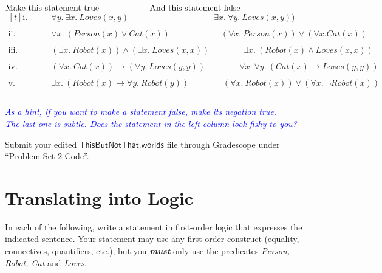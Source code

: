 \documentclass{article}
\renewcommand{\(}{\left(}
\renewcommand{\)}{\right)}
\theoremstyle{plain}
\theoremstyle{plain}
\theoremstyle{definition}
\newcommand{\annotate}[1]{\textit{\textcolor{blue}{#1}}}
\begin{document}
$    \textrm{Make this statement true} \qquad \qquad \qquad \textrm{And this statement false}\\\\$
    $\begin{aligned}[t]
    \textrm{i.} \qquad &\forall y.\ \exists x.\ Loves(x, y)
    \qquad \qquad \qquad \qquad \qquad \exists x.\ \forall y.\ Loves(x, y))\\\\
    \textrm{ii.} \qquad &\forall x.\ (Person(x) \lor Cat(x))
    \qquad \qquad \qquad (\forall x.\ Person(x)) \lor (\forall x. Cat(x))\\\\
    \textrm{iii.} \qquad &(\exists x.\ Robot(x)) \land (\exists x.\ Loves (x,x))
    \qquad \qquad \exists x.\ (Robot(x) \land Loves(x,x))\\\\
    \textrm{iv.} \qquad &(\forall x.\ Cat(x)) \rightarrow (\forall y.\ Loves(y, y))
    \qquad \qquad \forall x.\ \forall y.\ (Cat(x) \rightarrow Loves(y,y))\\\\
    \textrm{v.} \qquad &\exists x.\ (Robot(x) \rightarrow \forall y.\ Robot(y))
    \qquad  \qquad (\forall x.\ Robot(x)) \lor (\forall x.\ \neg Robot(x))\\\\
    \end{aligned}$

        

\annotate{As a hint, if you want to make a statement false, make its negation true.\\
The last one is subtle. Does the statement in the left column look fishy to you?}

\begin{shaded}
  Submit your edited $\mathsf{ThisButNotThat.worlds}$ file
  through Gradescope under ``Problem Set 2 Code''.
\end{shaded}
\pagebreak


\section{Translating into Logic}

In each of the following,  write a statement in first-order logic that expresses the indicated sentence. Your statement may use any first-order construct (equality, connectives, quantifiers, etc.), but you \textbf{\textit{must}} only use the predicates \textit{Person, Robot, Cat} and \textit{Loves}.\\
\end{document}
